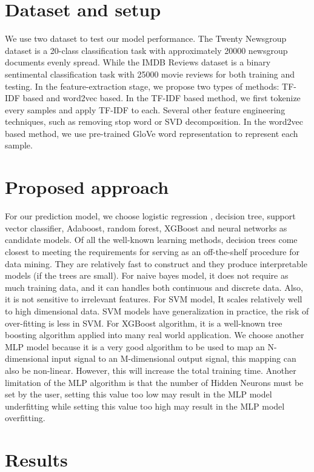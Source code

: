 \documentclass[11pt]{scrartcl}
\begin{document}
\section{Dataset and setup}
We use two dataset to test our model performance. The Twenty Newsgroup dataset is a 20-class classification task with approximately 20000 newsgroup documents evenly spread\cite{Lang95}. While the IMDB Reviews dataset is a binary sentimental classification task with 25000 movie reviews for both training and testing\cite{maas-EtAl:2011:ACL-HLT2011}. In the feature-extraction stage, we propose two types of methods: TF-IDF based and word2vec based. In the TF-IDF based method, we first tokenize every samples and apply TF-IDF to each. Several other feature engineering techniques, such as removing stop word or SVD decomposition. In the word2vec based method, we use pre-trained GloVe\cite{pennington2014glove} word representation to represent each sample.

\section{Proposed approach}
For our prediction model, we choose logistic regression , decision tree, support vector classifier, Adaboost, random forest, XGBoost and neural networks as candidate models. Of all the well-known learning methods, decision trees come closest to meeting the requirements for serving as an off-the-shelf procedure for data mining. They are relatively fast to construct and they produce interpretable models (if the trees are small). For naive bayes model, it does not require as much training data, and it can handles both continuous and discrete data. Also, it is not sensitive to irrelevant features. For SVM model, It scales relatively well to high dimensional data. SVM models have generalization in practice, the risk of over-fitting is less in SVM. For XGBoost algorithm, it is a well-known tree boosting algorithm applied into many real world application. We choose another MLP model because it is a very good algorithm to be used to map an N-dimensional input signal to an M-dimensional output signal, this mapping can also be non-linear. However, this will increase the total training time. Another limitation of the MLP algorithm is that the number of Hidden Neurons must be set by the user, setting this value too low may result in the MLP model underfitting while setting this value too high may result in the MLP model overfitting. 

\section{Results}
\end{document}
